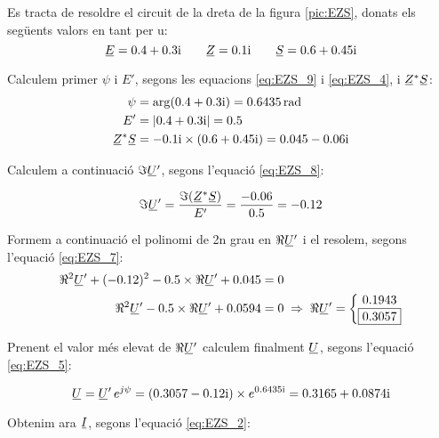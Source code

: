 \begin{exemple}\label{ex:ResCircPotAbs}
	\addcontentsxms{\ResCircPotAbs}
    Es tracta de resoldre el circuit de la dreta de la figura \vref{pic:EZS}, donats els següents valors en tant per u:\label{ex:res-circ-pot}
    \[
       \cmplx{E} = \complexnum{0,4 + j 0,3} \qquad \cmplx{Z} = \complexnum{j 0,1} \qquad
       \cmplx{S} = \complexnum{0,6 + j 0,45}
    \]

    Calculem primer $\psi$ i $E'$, segons les equacions \eqref{eq:EZS_9} i \eqref{eq:EZS_4},
    i $\cmplx{Z}^* \cmplx{S}$:
    \begin{align*}
       \psi &= \arg(\complexnum{0,4 + j 0,3}) = \qty{0,6435}{rad} \\
       E' &= |\complexnum{0,4 + j 0,3}| = \num {0,5} \\
       \cmplx{Z}^* \cmplx{S} &= \complexnum{- j 0,1} \times (\complexnum{0,6 + j 0,45}) = \complexnum{0,045 - j 0,06}
    \end{align*}

    Calculem a continuació $\Im\cmplx{U}'$, segons l'equació \eqref{eq:EZS_8}:

    \[
       \Im\cmplx{U}' = \frac{\Im(\cmplx{Z}^* \cmplx{S})}{E'} = \frac{\num{-0,06}}{\num{0,5}} = \num{-0,12}
    \]

    Formem a continuació el polinomi de 2n grau en $\Re\cmplx{U}'$ i el resolem, segons l'equació \eqref{eq:EZS_7}:
    \begin{align*}
       \Re^2\cmplx{U}' + (\num{-0,12})^2 - \num{0,5} \times \Re\cmplx{U}' + \num{0,045} &= 0 \\
       \Re^2\cmplx{U}' - \num{0,5} \times \Re\cmplx{U}' + \num{0,0594} &= 0  \;\Rightarrow\; \Re\cmplx{U}' =
       \left\{ \begin{matrix}
         \num{0,1943} \\
         \boxed{\num{0,3057}}
       \end{matrix}
       \right.
    \end{align*}

    Prenent el valor més elevat de $\Re\cmplx{U}'$ calculem finalment $\cmplx{U}$, segons l'equació \eqref{eq:EZS_5}:

    \[
       \cmplx{U} = \cmplx{U}' \, e^{j \psi} = (\complexnum{0,3057 - j 0,12}) \times e^{\complexnum{j 0,6435}} =
       \complexnum{0,3165 + j 0,0874}
    \]

    Obtenim ara $\cmplx{I}$, segons l'equació \eqref{eq:EZS_2}:


\end{exemple}
